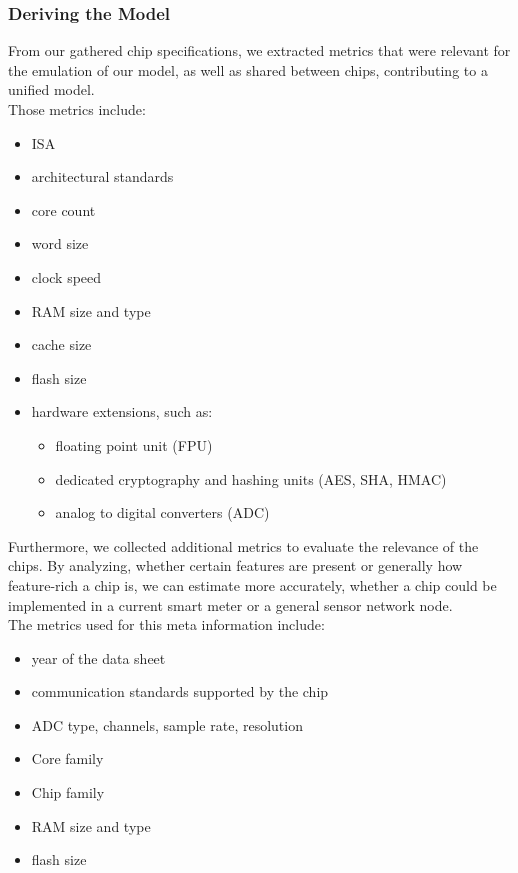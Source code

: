 \documentclass[english]{tudscrartcl}
\begin{document}
			\subsubsection{Deriving the Model}
				\label{sec:sysmodel_sm_derivingmodel}
				From our gathered chip specifications, we extracted metrics that were relevant for the emulation of our model, as well as shared between chips, contributing to a unified model.
				\\
				Those metrics include:
				\begin{itemize}
					\item \ac{ISA}
					\item architectural standards
					\item core count
					\item word size
					\item clock speed
					\item RAM size and type
					\item cache size
					\item flash size
					\item hardware extensions, such as:
						\begin{itemize}
							\item floating point unit (FPU)
							\item dedicated cryptography and hashing units (AES, SHA, HMAC)
							\item analog to digital converters (ADC)
						\end{itemize}
				\end{itemize}
				Furthermore, we collected additional metrics to evaluate the relevance of the chips. By analyzing, whether certain features are present or generally how feature-rich a chip is, we can estimate more accurately, whether a chip could be implemented in a current smart meter or a general sensor network node.
				\\
				The metrics used for this meta information include:
				\begin{itemize}
					\item year of the data sheet
					\item communication standards supported by the chip
					\item ADC type, channels, sample rate, resolution
					\item Core family
					\item Chip family
					\item RAM size and type
					\item flash size
				\end{itemize}
\end{document}
